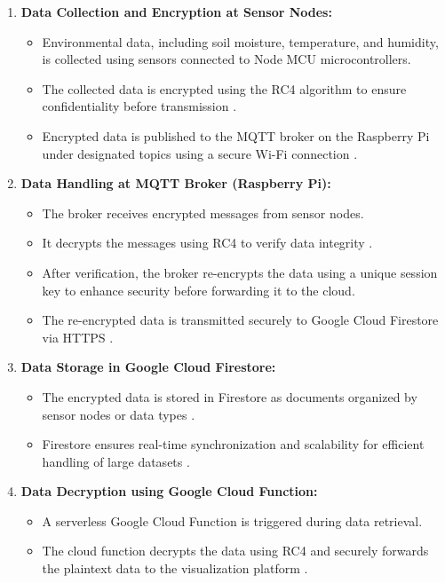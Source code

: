 \documentclass[journal]{Definitions/mdpi}
\begin{document}
\begin{enumerate}
    \item \textbf{Data Collection and Encryption at Sensor Nodes:}
    \begin{itemize}
        \item Environmental data, including soil moisture, temperature, and humidity, is collected using sensors connected to Node MCU microcontrollers.
        \item The collected data is encrypted using the RC4 algorithm to ensure confidentiality before transmission \cite{ref-journal6}.
        \item Encrypted data is published to the MQTT broker on the Raspberry Pi under designated topics using a secure Wi-Fi connection \cite{ref-conference3}.
    \end{itemize}
    \item \textbf{Data Handling at MQTT Broker (Raspberry Pi):}
    \begin{itemize}
        \item The broker receives encrypted messages from sensor nodes.
        \item It decrypts the messages using RC4 to verify data integrity \cite{ref-journal7}.
        \item After verification, the broker re-encrypts the data using a unique session key to enhance security before forwarding it to the cloud.
        \item The re-encrypted data is transmitted securely to Google Cloud Firestore via HTTPS \cite{ref-cloud3}.
    \end{itemize}
    \item \textbf{Data Storage in Google Cloud Firestore:}
    \begin{itemize}
        \item The encrypted data is stored in Firestore as documents organized by sensor nodes or data types \cite{ref-cloud1}.
        \item Firestore ensures real-time synchronization and scalability for efficient handling of large datasets \cite{ref-cloud2}.
    \end{itemize}
    \item \textbf{Data Decryption using Google Cloud Function:}
    \begin{itemize}
        \item A serverless Google Cloud Function is triggered during data retrieval.
        \item The cloud function decrypts the data using RC4 and securely forwards the plaintext data to the visualization platform \cite{ref-cloud3}.

\end{itemize}
\end{enumerate}
\end{document}
